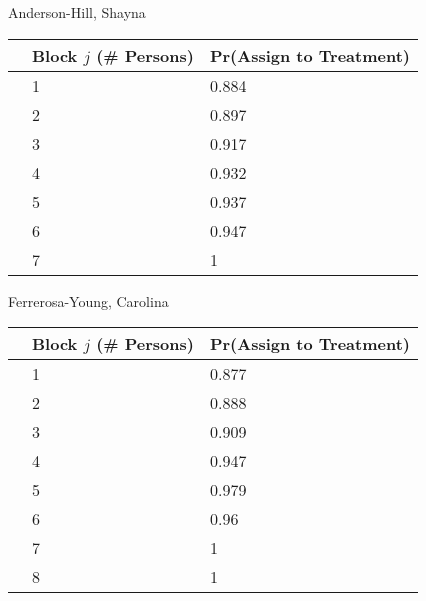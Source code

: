 \documentclass[11pt,notitlepage]{article}
\begin{document}
\begin{table}[h!]
\begin{center}
\begin{minipage}[t]{0.45\linewidth}\centering

Anderson-Hill, Shayna

\begin{tabular}{rll}
  \hline
 & Block $j$ (\# Persons) & Pr(Assign to Treatment) \\ 
  \hline
 & 1 & 0.884 \\ 
 & 2 & 0.897 \\ 
 & 3 & 0.917 \\ 
 & 4 & 0.932 \\ 
 & 5 & 0.937 \\ 
 & 6 & 0.947 \\ 
 & 7 & 1 \\ 
   \hline
\end{tabular}

\end{minipage}
\hspace{0.5cm}
\begin{minipage}[t]{0.45\linewidth}\centering

Ferrerosa-Young, Carolina

\begin{tabular}{rll}
  \hline
 & Block $j$ (\# Persons) & Pr(Assign to Treatment) \\ 
  \hline
  & 1 & 0.877 \\ 
  & 2 & 0.888 \\ 
  & 3 & 0.909 \\ 
  & 4 & 0.947 \\ 
  & 5 & 0.979 \\ 
  & 6 & 0.96 \\ 
  & 7 & 1 \\ 
  & 8 & 1 \\ 
   \hline
\end{tabular}
\end{minipage}

\end{center}
\end{table}
\end{document}
